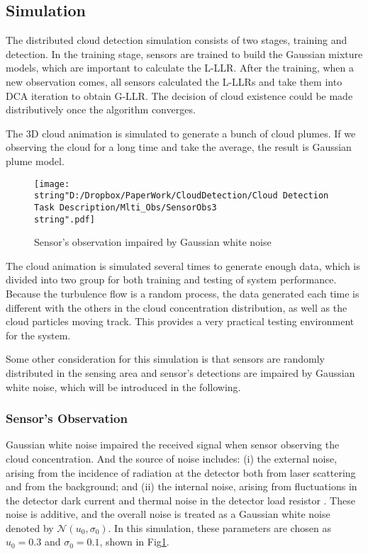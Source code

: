 \subsection{Simulation\label{sec:Simulation}}

The distributed cloud detection simulation consists of two stages,
training and detection. In the training stage, sensors are trained
to build the Gaussian mixture models, which are important to calculate
the L-LLR. After the training, when a new observation comes, all sensors
calculated the L-LLRs and take them into DCA iteration to obtain G-LLR.
The decision of cloud existence could be made distributively once
the algorithm converges. 

The 3D cloud animation is simulated to generate a bunch of cloud plumes.
If we observing the cloud for a long time and take the average, the
result is Gaussian plume model. 

\begin{figure}
\hfill{}\texttt{[image: \\string"D:/Dropbox/PaperWork/CloudDetection/Cloud Detection Task Description/Mlti\_Obs/SensorObs3\\string".pdf]}\hfill{}\hfill{}\caption{\label{fig:Sensor's obs}Sensor's observation impaired by Gaussian
white noise}
\end{figure}


The cloud animation is simulated several times to generate enough
data, which is divided into two group for both training and testing
of system performance. Because the turbulence flow is a random process,
the data generated each time is different with the others in the cloud
concentration distribution, as well as the cloud particles moving
track. This provides a very practical testing environment for the
system. 

Some other consideration for this simulation is that sensors are randomly
distributed in the sensing area and sensor's detections are impaired
by Gaussian white noise, which will be introduced in the following. 


\subsubsection{Sensor's Observation }

Gaussian white noise impaired the received signal when sensor observing
the cloud concentration. And the source of noise includes: (i) the
external noise, arising from the incidence of radiation at the detector
both from laser scattering and from the background; and (ii) the internal
noise, arising from fluctuations in the detector dark current and
thermal noise in the detector load resistor \cite{P.M.Hamilton1969}.
These noise is additive, and the overall noise is treated as a Gaussian
white noise denoted by $\mathcal{N}\left(u_{0},\sigma_{0}\right)$.
In this simulation, these parameters are chosen as $u_{0}=0.3$ and
$\sigma_{0}=0.1$, shown in Fig\ref{fig:Sensor's obs}.

